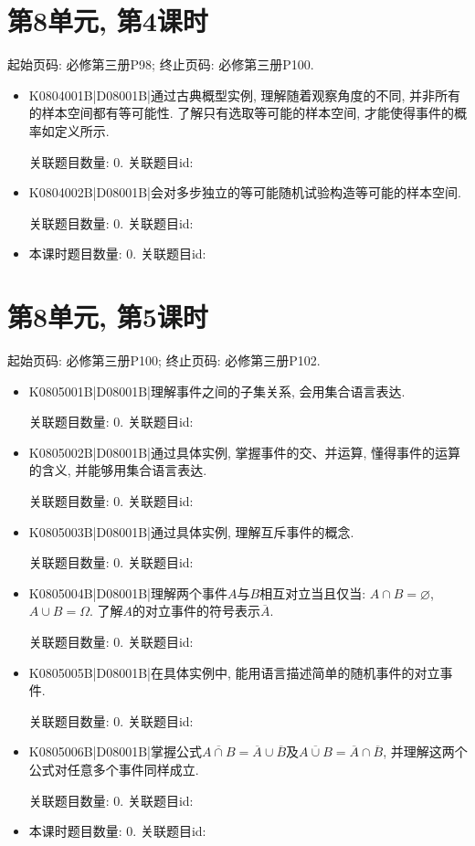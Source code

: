 \section*{第8单元, 第4课时}
起始页码: 必修第三册P98; 终止页码: 必修第三册P100.
\begin{itemize}
\item K0804001B|D08001B|通过古典概型实例, 理解随着观察角度的不同, 并非所有的样本空间都有等可能性. 了解只有选取等可能的样本空间, 才能使得事件的概率如定义所示.

关联题目数量: 0. 关联题目id: 

\item K0804002B|D08001B|会对多步独立的等可能随机试验构造等可能的样本空间.

关联题目数量: 0. 关联题目id: 

\item 本课时题目数量: 0. 关联题目id: 

\end{itemize}

\section*{第8单元, 第5课时}
起始页码: 必修第三册P100; 终止页码: 必修第三册P102.
\begin{itemize}
\item K0805001B|D08001B|理解事件之间的子集关系, 会用集合语言表达.

关联题目数量: 0. 关联题目id: 

\item K0805002B|D08001B|通过具体实例, 掌握事件的交、并运算, 懂得事件的运算的含义, 并能够用集合语言表达.

关联题目数量: 0. 关联题目id: 

\item K0805003B|D08001B|通过具体实例, 理解互斥事件的概念.

关联题目数量: 0. 关联题目id: 

\item K0805004B|D08001B|理解两个事件$A$与$B$相互对立当且仅当: $A\cap B=\varnothing$, $A\cup B=\Omega$. 了解$A$的对立事件的符号表示$\overline A$.

关联题目数量: 0. 关联题目id: 

\item K0805005B|D08001B|在具体实例中, 能用语言描述简单的随机事件的对立事件.

关联题目数量: 0. 关联题目id: 

\item K0805006B|D08001B|掌握公式$\overline{A\cap B}=\overline A\cup\overline B$及$\overline{A\cup B}=\overline A\cap\overline B$, 并理解这两个公式对任意多个事件同样成立.

关联题目数量: 0. 关联题目id: 

\item 本课时题目数量: 0. 关联题目id: 

\end{itemize}

